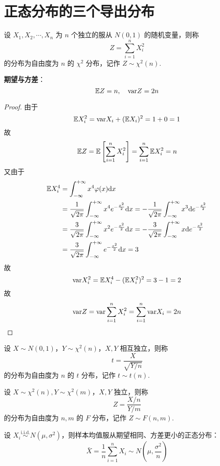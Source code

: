 \section{正态分布的三个导出分布}
\label{sec:normal-derive}

\begin{definition}[$\chi^2$ 分布]
设 $X_1,X_2,\cdots,X_n$ 为 $n$ 个独立的服从 $N(0,1)$ 的随机变量，则称
\[
Z=\sum\limits_{i=1}^nX_i^2
\]
的分布为自由度为 $n$ 的 $\chi^2$ 分布，记作 $Z\sim \chi^2(n)$. 
\end{definition}

\noindent\textbf{期望与方差}：
\[
\mathbb{E} Z=n,\quad\mathrm{var} Z=2n
\]
\begin{proof}
由于
\[
\mathbb{E} X_i^2=\mathrm{var} X_i+(\mathbb{E} X_i)^2=1+0=1
\]
故
\[
\mathbb{E} Z=\mathbb{E} \left[\sum_{i=1}^nX_i^2\right]=\sum_{i=1}^n\mathbb{E} X_i^2=n
\]
又由于
\begin{align*}
\mathbb{E} X_i^4&=\int_{-\infty}^{+\infty}x^4\varphi(x)\mathrm dx\\
&=\frac{1}{\sqrt{2\pi}}\int_{-\infty}^{+\infty}x^4e^{-\frac{x^2}{2}}\mathrm dx
=-\frac{1}{\sqrt{2\pi}}\int_{-\infty}^{+\infty}x^3\mathrm d e^{-\frac{x^2}{2}}\\
&=\frac{3}{\sqrt{2\pi}}\int_{-\infty}^{+\infty}x^2e^{-\frac{x^2}{2}}\mathrm dx
=-\frac{3}{\sqrt{2\pi}}\int_{-\infty}^{+\infty}x\mathrm de^{-\frac{x^2}{2}}\\
&=\frac{3}{\sqrt{2\pi}}\int_{-\infty}^{+\infty}e^{-\frac{x^2}{2}}\mathrm dx=3
\end{align*}
故
\[
\mathrm{var} X_i^2=\mathbb{E} X_i^4-(\mathbb{E} X_i^2)^2=3-1=2
\]
故
\[
\mathrm{var} Z=\mathrm{var} \sum_{i=1}^nX_i^2=\sum_{i=1}^n\mathrm{var} X_i=2n
\]
\end{proof}


\begin{definition}[$t$ 分布]
设 $X\sim N(0,1)$，$Y\sim \chi^2(n)$，$X,Y$ 相互独立，则称
\[
t=\frac{X}{\sqrt{Y/n}}
\]
的分布为自由度为 $n$ 的 $t$ 分布，记作 $t\sim t(n)$. 
\end{definition}


\begin{definition}[$F$ 分布]
设 $X\sim\chi^2(n),Y\sim\chi^2(m)$，$X,Y$ 独立，则称
\[
Z=\frac{X/n}{Y/m}
\]
的分布为自由度为 $n,m$ 的 $F$ 分布，记作 $Z\sim F(n,m)$. 
\end{definition}


\begin{theorem}
设 $X_i\overset{\text{i.i.d.}}{\sim} N(\mu,\sigma^2)$，则样本均值服从期望相同、方差更小的正态分布：
\[
\bar X=\frac{1}{n}\sum\limits_{i=1}^nX_i\sim N\left(\mu,\frac{\sigma^2}{n}\right)
\]
\end{theorem}


